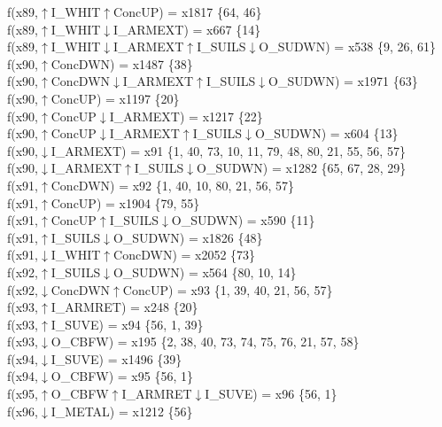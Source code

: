 f(x89,$\uparrow$I\_WHIT$\uparrow$ConcUP) = x1817 \{64, 46\} \\  
f(x89,$\uparrow$I\_WHIT$\downarrow$I\_ARMEXT) = x667 \{14\} \\  
f(x89,$\uparrow$I\_WHIT$\downarrow$I\_ARMEXT$\uparrow$I\_SUILS$\downarrow$O\_SUDWN) = x538 \{9, 26, 61\} \\  
f(x90,$\uparrow$ConcDWN) = x1487 \{38\} \\  
f(x90,$\uparrow$ConcDWN$\downarrow$I\_ARMEXT$\uparrow$I\_SUILS$\downarrow$O\_SUDWN) = x1971 \{63\} \\  
f(x90,$\uparrow$ConcUP) = x1197 \{20\} \\  
f(x90,$\uparrow$ConcUP$\downarrow$I\_ARMEXT) = x1217 \{22\} \\  
f(x90,$\uparrow$ConcUP$\downarrow$I\_ARMEXT$\uparrow$I\_SUILS$\downarrow$O\_SUDWN) = x604 \{13\} \\  
f(x90,$\downarrow$I\_ARMEXT) = x91 \{1, 40, 73, 10, 11, 79, 48, 80, 21, 55, 56, 57\} \\  
f(x90,$\downarrow$I\_ARMEXT$\uparrow$I\_SUILS$\downarrow$O\_SUDWN) = x1282 \{65, 67, 28, 29\} \\  
f(x91,$\uparrow$ConcDWN) = x92 \{1, 40, 10, 80, 21, 56, 57\} \\  
f(x91,$\uparrow$ConcUP) = x1904 \{79, 55\} \\  
f(x91,$\uparrow$ConcUP$\uparrow$I\_SUILS$\downarrow$O\_SUDWN) = x590 \{11\} \\  
f(x91,$\uparrow$I\_SUILS$\downarrow$O\_SUDWN) = x1826 \{48\} \\  
f(x91,$\downarrow$I\_WHIT$\uparrow$ConcDWN) = x2052 \{73\} \\  
f(x92,$\uparrow$I\_SUILS$\downarrow$O\_SUDWN) = x564 \{80, 10, 14\} \\  
f(x92,$\downarrow$ConcDWN$\uparrow$ConcUP) = x93 \{1, 39, 40, 21, 56, 57\} \\  
f(x93,$\uparrow$I\_ARMRET) = x248 \{20\} \\  
f(x93,$\uparrow$I\_SUVE) = x94 \{56, 1, 39\} \\  
f(x93,$\downarrow$O\_CBFW) = x195 \{2, 38, 40, 73, 74, 75, 76, 21, 57, 58\} \\  
f(x94,$\downarrow$I\_SUVE) = x1496 \{39\} \\  
f(x94,$\downarrow$O\_CBFW) = x95 \{56, 1\} \\  
f(x95,$\uparrow$O\_CBFW$\uparrow$I\_ARMRET$\downarrow$I\_SUVE) = x96 \{56, 1\} \\  
f(x96,$\downarrow$I\_METAL) = x1212 \{56\} \\  
